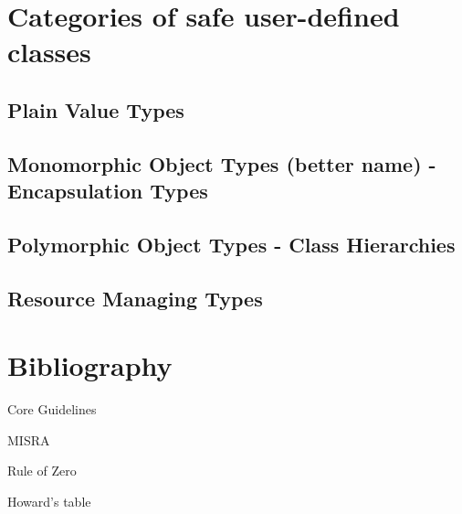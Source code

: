 \documentclass[ebook,11pt,article]{memoir}
\begin{document}
\chapter{Categories of safe user-defined classes}
\section{Plain Value Types}
\section{Monomorphic Object Types (better name) - Encapsulation Types}
\section{Polymorphic Object Types - Class Hierarchies}
\section{Resource Managing Types}


\chapter{Bibliography}
Core Guidelines

MISRA

Rule of Zero

Howard's table
\end{document}
